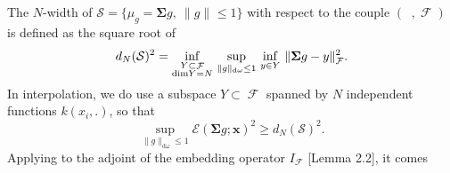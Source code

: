 \documentclass[twoside,11pt]{book}
\numberwithin{theorem}{chapter}
\numberwithin{definition}{chapter}
\numberwithin{proposition}{chapter}
\numberwithin{corollary}{chapter}
\numberwithin{example}{chapter}
\numberwithin{lemma}{chapter}
\numberwithin{assumption}{chapter}
\DeclareMathOperator{\F}{\mathcal{F}}
\DeclareMathOperator{\Ltwo}{\mathbb{L}_{2}(\mathrm{d} \omega)}
\newcommand{\rb}[1]{\textcolor{magenta}{#1}}
\begin{document}
 The $N$-width of $\mathcal{S} = \{ \mu_{g} = \bm{\bm{\Sigma}}g, \: \|g\|_{\Ltwo} \leq 1\}$ with respect to the couple $(\Ltwo, \F)$ \citep[Chapter 1.7]{Pin12} is defined as the square root of
\begin{equation}
	d_{N}(\mathcal{S})^{2}  = \inf\limits_{\substack{Y \subset \F\\ \mathrm{dim}Y = N}}\, \sup\limits_{\|g\|_{\mathrm{d}\omega} \leq 1}\, \inf\limits_{y \in Y}\, \|\bm{\Sigma} g -y \|_{\F}^{2}. \nonumber \\
\end{equation}
In interpolation, we do use a subspace $Y \subset \F$ spanned by $N$ independent functions $k(x_{i},.)$, so that
\begin{equation}
\sup\limits_{\|g\|_{\mathrm{d}\omega} \leq 1} \mathcal{E}(\bm{\Sigma} g;\bm{x})^{2} \geq d_{N}(\mathcal{S})^{2}.
\end{equation}
Applying \citep[Theorem 2.2, Chapter 4]{Pin12} to the adjoint of the embedding operator $I_{\F}$ \cite{StSc12}[Lemma 2.2], it comes
%
\end{document}
